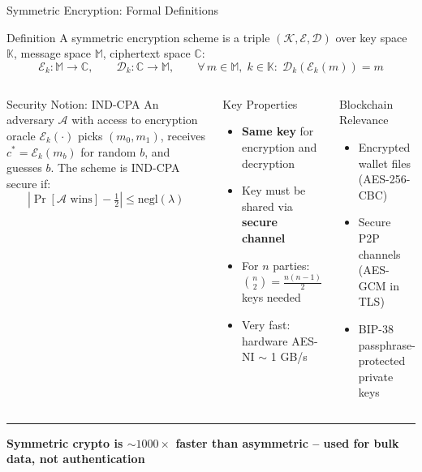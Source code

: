 \documentclass[8pt,aspectratio=169]{beamer}
\newcommand{\bottomnote}[1]{\vfill\vspace{-2mm}\textcolor{mllavender2}{\rule{\textwidth}{0.4pt}}\vspace{1mm}\footnotesize\textbf{#1}}
\begin{document}
\begin{frame}{Symmetric Encryption: Formal Definitions}
\begin{block}{Definition}
A symmetric encryption scheme is a triple $(\mathcal{K}, \mathcal{E}, \mathcal{D})$ over key space $\mathbb{K}$, message space $\mathbb{M}$, ciphertext space $\mathbb{C}$:
\[
  \mathcal{E}_k : \mathbb{M} \to \mathbb{C}, \qquad \mathcal{D}_k : \mathbb{C} \to \mathbb{M}, \qquad \forall\, m \in \mathbb{M},\; k \in \mathbb{K}:\; \mathcal{D}_k(\mathcal{E}_k(m)) = m
\]
\end{block}
\vspace{1mm}
\begin{columns}
\begin{block}{Security Notion: IND-CPA}
\small An adversary $\mathcal{A}$ with access to encryption oracle $\mathcal{E}_k(\cdot)$ picks $(m_0, m_1)$, receives $c^* = \mathcal{E}_k(m_b)$ for random $b$, and guesses $b$. The scheme is IND-CPA secure if:
\[
  \left|\Pr[\mathcal{A} \text{ wins}] - \tfrac{1}{2}\right| \leq \text{negl}(\lambda)
\]
\end{block}
\begin{block}{Key Properties}
\begin{itemize}\small
  \item \textbf{Same key} for encryption and decryption
  \item Key must be shared via \textbf{secure channel}
  \item For $n$ parties: $\binom{n}{2} = \frac{n(n-1)}{2}$ keys needed
  \item Very fast: hardware AES-NI $\sim$ 1 GB/s
\end{itemize}
\end{block}
\vspace{1mm}
\begin{block}{Blockchain Relevance}
\begin{itemize}\small
  \item Encrypted wallet files (AES-256-CBC)
  \item Secure P2P channels (AES-GCM in TLS)
  \item BIP-38 passphrase-protected private keys
\end{itemize}
\end{block}
\end{columns}
\bottomnote{Symmetric crypto is $\sim\!1000\times$ faster than asymmetric -- used for bulk data, not authentication}
\end{frame}
\end{document}

